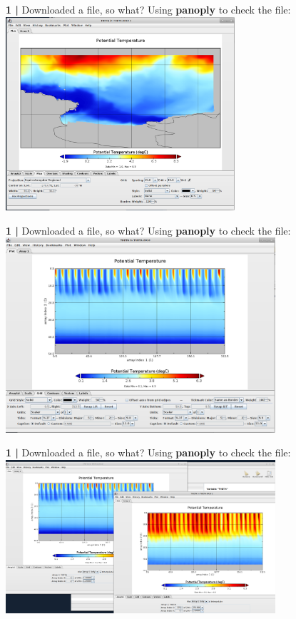 \begin{frame}{\textbf{1 |} Downloaded a file, so what?}
    Using \textbf{panoply} to check the file:
    \centering\includegraphics[width=8.5cm]{images/Panoply4.png} \\
\end{frame}


\begin{frame}{\textbf{1 |} Downloaded a file, so what?}
    Using \textbf{panoply} to check the file:
    \centering\includegraphics[width=10cm]{images/Panoply5.png} \\
\end{frame}


\begin{frame}{\textbf{1 |} Downloaded a file, so what?}
    Using \textbf{panoply} to check the file:
    \centering\includegraphics[width=10cm]{images/Panoply6.png} \\
\end{frame}


